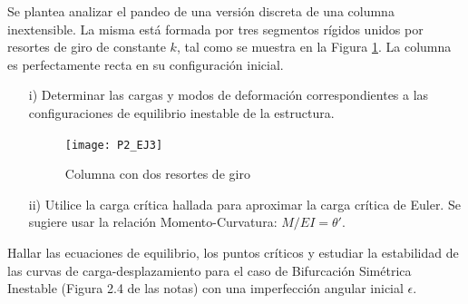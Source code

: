 
\bigskip
\begin{exercise}
	
	Se plantea analizar el pandeo de una versión discreta de una columna inextensible. La misma está formada por tres segmentos rígidos unidos por resortes de giro de constante $k$, tal como se muestra en la Figura \ref{fig:Ej3}. La columna es perfectamente recta en su configuración inicial.
	
	\begin{enumerate}
		\item[i)] Determinar las cargas y modos de deformación correspondientes a las configuraciones de equilibrio inestable de la estructura.
		
		\begin{figure}[h!]
			\centering
			\texttt{[image: P2\_EJ3]}
			\caption{Columna con dos resortes de giro}
			\label{fig:Ej3}
		\end{figure}
		
		\item[ii)] Utilice la carga crítica hallada para aproximar la carga crítica de Euler. Se sugiere usar la relación Momento-Curvatura: $M/EI=\theta'$.
		
	\end{enumerate}
	
\end{exercise}


\bigskip
\begin{exercise}
	
	Hallar las ecuaciones de equilibrio, los puntos críticos y estudiar la estabilidad de las curvas de carga-desplazamiento para el caso de Bifurcación Simétrica Inestable (Figura 2.4 de las notas) con una imperfección angular inicial $\epsilon$.
\end{exercise}



